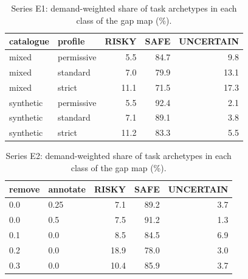 \begin{table}[!ht]\centering\caption{Series E1: demand-weighted share of task archetypes in each class of the gap map (\%).}\label{tab:e1}\scriptsize
\begin{tabular}{llrrr}\toprule
catalogue & profile & RISKY & SAFE & UNCERTAIN \\ \midrule
mixed & permissive & 5.5 & 84.7 & 9.8 \\
mixed & standard & 7.0 & 79.9 & 13.1 \\
mixed & strict & 11.1 & 71.5 & 17.3 \\
synthetic & permissive & 5.5 & 92.4 & 2.1 \\
synthetic & standard & 7.1 & 89.1 & 3.8 \\
synthetic & strict & 11.2 & 83.3 & 5.5 \\
\bottomrule\end{tabular}\end{table}
\begin{table}[!ht]\centering\caption{Series E2: demand-weighted share of task archetypes in each class of the gap map (\%).}\label{tab:e2}\scriptsize
\begin{tabular}{llrrr}\toprule
remove & annotate & RISKY & SAFE & UNCERTAIN \\ \midrule
0.0 & 0.25 & 7.1 & 89.2 & 3.7 \\
0.0 & 0.5 & 7.5 & 91.2 & 1.3 \\
0.1 & 0.0 & 8.5 & 84.5 & 6.9 \\
0.2 & 0.0 & 18.9 & 78.0 & 3.0 \\
0.3 & 0.0 & 10.4 & 85.9 & 3.7 \\
\bottomrule\end{tabular}\end{table}
